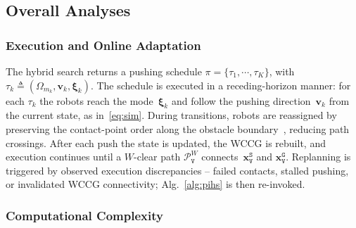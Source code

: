 \subsection{Overall Analyses}\label{subsec:overall}

\subsubsection{Execution and Online Adaptation}\label{subsec:execute}
The hybrid search returns a pushing schedule
$\pi = \{\tau_1,\cdots,\tau_K\}$, with
$\tau_k \triangleq (\Omega_{m_k},\mathbf{v}_k,\boldsymbol{\xi}_k)$.
The schedule is executed in a receding-horizon manner: for each $\tau_k$ the
robots reach the mode~$\boldsymbol{\xi}_k$ and follow the pushing
direction~$\mathbf{v}_k$ from the current state, as in~\eqref{eq:sim}.
 During transitions, robots are
reassigned by preserving the contact-point order along the obstacle
boundary~\cite{tang2026pushingbots}, reducing path crossings. After each push the state is updated, the WCCG is rebuilt, and execution continues
until a $W$-clear path
$\mathcal{P}^W_\texttt{V}$ connects~$\mathbf{x}_\texttt{V}^{\texttt{S}}$ and
$\mathbf{x}_\texttt{V}^{\texttt{G}}$.
Replanning is triggered by observed execution discrepancies -- failed contacts,
stalled pushing, or invalidated WCCG connectivity; Alg.~\ref{alg:pihs}
is then re-invoked.

\subsubsection{Computational Complexity}\label{subsubsec:complexity}

